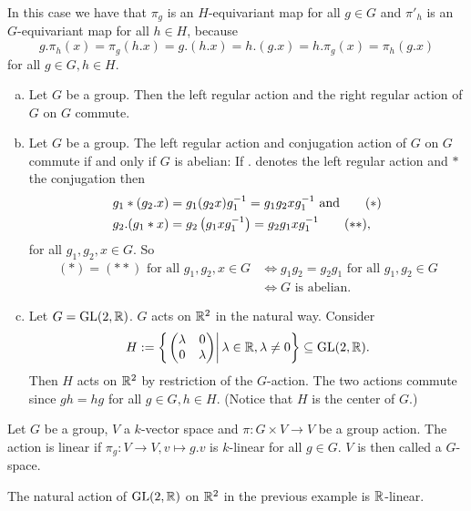 \begin{rem}
 In this case we have that $\pi_g$ is an $H$-equivariant map for all $g \in G$ and $\pi'_h$ is an $G$-equivariant map for all $h \in H$, because
 \[
  g.\pi_h(x) = \pi_g(h.x) = g.(h.x) = h.(g.x) = h.\pi_g(x) = \pi_h(g.x)
 \]
 for all $g \in G, h \in H$.
\end{rem}


\begin{expls}
 \begin{enumerate}[a)]
  \item
   Let $G$ be a group. Then the left regular action and the right regular action of $G$ on $G$ commute.
  \item
   Let $G$ be a group. The left regular action and conjugation action of $G$ on $G$ commute if and only if $G$ is abelian: If $.$ denotes the left regular action and $*$ the conjugation then
   \begin{align*}
    g_1*(g_2.x) &= g_1 (g_2 x) g_1^{-1} = g_1 g_2 x g_1^{-1} \text{ and} \tag{\ensuremath{\ast}}\\
    g_2.(g_1*x) &= g_2 \left(g_1 x g_1^{-1}\right) = g_2 g_1 x g_1^{-1} \tag{\ensuremath{\ast\ast}},
   \end{align*}
   for all $g_1, g_2, x \in G$. So
   \begin{align*}
    (\ast) = (\ast\ast) \text{ for all } g_1, g_2, x \in G
    &\Leftrightarrow g_1 g_2 = g_2 g_1 \text{ for all } g_1, g_2 \in G \\
    &\Leftrightarrow \text{$G$ is abelian}.
   \end{align*}
  \item
   Let $G = \operatorname{GL}(2,\mathbb{R})$. $G$ acts on $\mathbb{R}^2$ in the natural way. Consider
   \[
    H := \left\{ \left. \begin{pmatrix}\lambda&0\\0&\lambda\end{pmatrix} \right| \lambda \in \mathbb{R}, \lambda \neq 0 \right\} \subseteq \operatorname{GL}(2,\mathbb{R}).
   \]
   Then $H$ acts on $\mathbb{R}^2$ by restriction of the $G$-action. The two actions commute since $gh = hg$ for all $g \in G, h \in H$. (Notice that $H$ is the center of $G$.)
 \end{enumerate}
\end{expls}


\begin{defi}
 Let $G$ be a group, $V$ a $k$-vector space and $\pi : G \times V \to V$ be a group action. The action is linear if $\pi_g : V \to V, v \mapsto g.v$ is $k$-linear for all $g \in G$. $V$ is then called a $G$-space.
\end{defi}


\begin{expl}
 The natural action of $\operatorname{GL}(2,\mathbb{R})$ on $\mathbb{R}^2$ in the previous example is $\mathbb{R}$-linear.
\end{expl}


